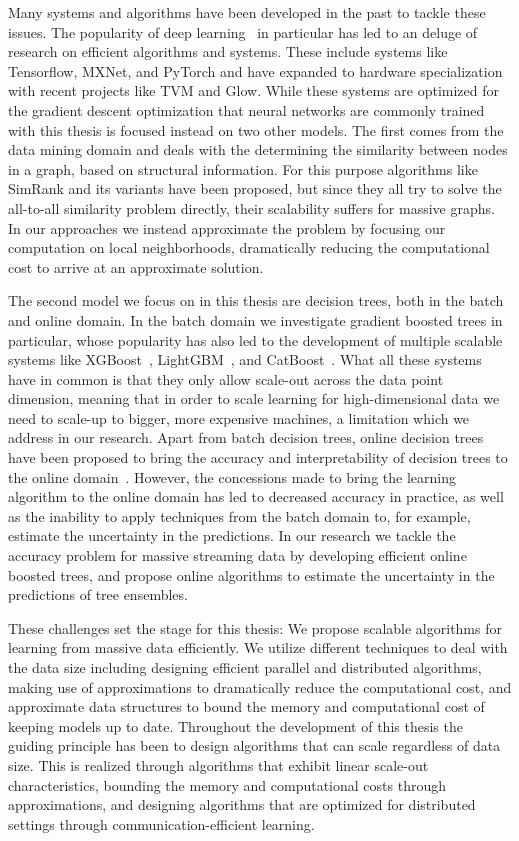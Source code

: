 Many systems and algorithms have been developed in the past to
tackle these issues. The popularity of deep learning~\cite{deep-learning}
in particular has led to an deluge of research on efficient
algorithms and systems. These include systems like Tensorflow, MXNet,
and PyTorch and have expanded to hardware specialization with recent projects
like TVM and Glow. While these systems are optimized for the gradient
descent optimization that neural networks are commonly trained with
this thesis is focused instead on two other models. The first comes
from the data mining domain and deals with the determining the
similarity between nodes in a graph, based on structural information.
For this purpose algorithms like SimRank and its variants have been
proposed, but since they all try to solve the all-to-all similarity
problem directly, their scalability suffers for massive graphs.
In our approaches we instead approximate the problem by focusing
our computation on local neighborhoods, dramatically reducing the
computational cost to arrive at an approximate solution.

The second model we focus on in this thesis are decision trees,
both in the batch and online domain. In the batch domain we investigate
gradient boosted trees in particular, whose popularity has also led
to the development of multiple scalable systems like XGBoost~\cite{xgboost},
LightGBM~\cite{lightgbm}, and CatBoost~\cite{catboost}. What all these
systems have in common is that they only allow scale-out across
the data point dimension, meaning that in order to scale learning
for high-dimensional data we need to scale-up to bigger, more expensive
machines, a limitation which we address in our research. Apart from
batch decision trees, online decision trees have been proposed
to bring the accuracy and interpretability of decision trees to
the online domain~\cite{vfdt}. However, the concessions made to
bring the learning algorithm to the online domain has led to
decreased accuracy in practice, as well as the inability to apply
techniques from the batch domain to, for example, estimate the uncertainty
in the predictions. In our research we tackle the accuracy problem for
massive streaming data by developing efficient online boosted trees,
and propose online algorithms to estimate the uncertainty in the
predictions of tree ensembles.

These challenges set the stage for this thesis: We propose scalable algorithms
for learning from massive data efficiently. We utilize different techniques
to deal with the data size including designing efficient parallel and distributed
algorithms, making use of approximations to dramatically reduce the computational
cost, and approximate data structures to bound the memory and computational cost
of keeping models up to date. Throughout the development of this thesis the guiding
principle has been to design algorithms that can scale regardless of data size.
This is realized through algorithms that exhibit linear scale-out characteristics,
bounding the memory and computational costs through approximations, and designing
algorithms that are optimized for distributed settings through communication-efficient
learning.

